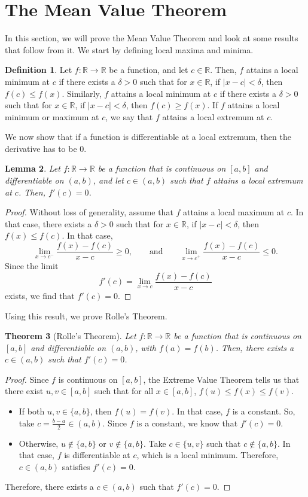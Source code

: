 \documentclass[a4paper, openany]{memoir}
\theoremstyle{definition}
\newtheorem{definition}{Definition}[section]
\theoremstyle{plain}
\newtheorem{theorem}[definition]{Theorem}
\newtheorem{lemma}[definition]{Lemma}
\begin{document}
\newpage

\section{The Mean Value Theorem}
In this section, we will prove the Mean Value Theorem and look at some results that follow from it. We start by defining local maxima and minima.
\begin{definition}
Let $f: \mathbb{R} \to \mathbb{R}$ be a function, and let $c \in \mathbb{R}$. Then, $f$ attains a local minimum at $c$ if there exists a $\delta > 0$ such that for $x \in \mathbb{R}$, if $|x - c| < \delta$, then $f(c) \leqslant f(x)$. Similarly, $f$ attains a local minimum at $c$ if there exists a $\delta > 0$ such that for $x \in \mathbb{R}$, if $|x - c| < \delta$, then $f(c) \geqslant f(x)$. If $f$ attains a local minimum or maximum at $c$, we say that $f$ attains a local extremum at $c$.
\end{definition}
\noindent We now show that if a function is differentiable at a local extremum, then the derivative has to be 0.
\begin{lemma}
Let $f: \mathbb{R} \to \mathbb{R}$ be a function that is continuous on $[a, b]$ and differentiable on $(a, b)$, and let $c \in (a, b)$ such that $f$ attains a local extremum at $c$. Then, $f'(c) = 0$.
\end{lemma}
\begin{proof}
Without loss of generality, assume that $f$ attains a local maximum at $c$. In that case, there exists a $\delta > 0$ such that for $x \in \mathbb{R}$, if $|x - c| < \delta$, then $f(x) \leqslant f(c)$. In that case,
\[\lim_{x \to c^-} \frac{f(x) - f(c)}{x - c} \geqslant 0, \qquad \text{and} \qquad \lim_{x \to c^+} \frac{f(x) - f(c)}{x - c} \leqslant 0.\]
Since the limit
\[f'(c) = \lim_{x \to c} \frac{f(x) - f(c)}{x - c}\]
exists, we find that $f'(c) = 0$.
\end{proof}
\noindent Using this result, we prove Rolle's Theorem.
\begin{theorem}[Rolle's Theorem]
Let $f: \mathbb{R} \to \mathbb{R}$ be a function that is continuous on $[a, b]$ and differentiable on $(a, b)$, with $f(a) = f(b)$. Then, there exists a $c \in (a, b)$ such that $f'(c) = 0$.
\end{theorem}
\begin{proof}
Since $f$ is continuous on $[a, b]$, the Extreme Value Theorem tells us that there exist $u, v \in [a, b]$ such that for all $x \in [a, b]$, $f(u) \leqslant f(x) \leqslant f(v)$.
\begin{itemize}
    \item If both $u, v \in \{a, b\}$, then $f(u) = f(v)$. In that case, $f$ is a constant. So, take $c = \frac{b-a}{2} \in (a, b)$. Since $f$ is a constant, we know that $f'(c) = 0$.
    
    \item Otherwise, $u \not\in \{a, b\}$ or $v \not\in \{a, b\}$. Take $c \in \{u, v\}$ such that $c \not\in \{a, b\}$. In that case, $f$ is differentiable at $c$, which is a local minimum. Therefore, $c \in (a, b)$ satisfies $f'(c) = 0$.
\end{itemize}
Therefore, there exists a $c \in (a, b)$ such that $f'(c) = 0$.
\end{proof}
\end{document}
